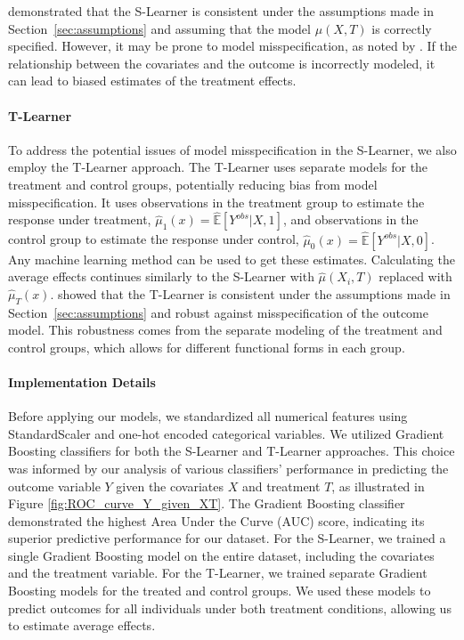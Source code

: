 \documentclass{article}
\begin{document}
\citet{hahn1998role} demonstrated that the S-Learner is consistent under the assumptions made in Section~\ref{sec:assumptions} and assuming that the model $\mu(X, T)$ is correctly specified. However, it may be prone to model misspecification, as noted by \citet{rubin1979using}. If the relationship between the covariates and the outcome is incorrectly modeled, it can lead to biased estimates of the treatment effects.

\paragraph{T-Learner} To address the potential issues of model misspecification in the S-Learner, we also employ the T-Learner approach. The T-Learner uses separate models for the treatment and control groups, potentially reducing bias from model misspecification. It uses observations in the treatment group to estimate the response under treatment, $\hat\mu_1(x) = \hat{\mathbb{E}}[Y^{obs} | X, 1]$, and observations in the control group to estimate the response under control, $\hat\mu_0(x) = \hat{\mathbb{E}}[Y^{obs} | X, 0]$. Any machine learning method can be used to get these estimates. Calculating the average effects continues similarly to the S-Learner with $\hat \mu (X_i, T)$ replaced with $\hat \mu_T(x)$.
\citet{greenland1986identifiability} showed that the T-Learner is consistent under the assumptions made in Section~\ref{sec:assumptions} and robust against misspecification of the outcome model. This robustness comes from the separate modeling of the treatment and control groups, which allows for different functional forms in each group.

\paragraph{Implementation Details} Before applying our models, we standardized all numerical features using StandardScaler and one-hot encoded categorical variables. We utilized Gradient Boosting classifiers for both the S-Learner and T-Learner approaches. This choice was informed by our analysis of various classifiers' performance in predicting the outcome variable $Y$ given the covariates $X$ and treatment $T$, as illustrated in Figure \ref{fig:ROC_curve_Y_given_XT}. The Gradient Boosting classifier demonstrated the highest Area Under the Curve (AUC) score, indicating its superior predictive performance for our dataset.
For the S-Learner, we trained a single Gradient Boosting model on the entire dataset, including the covariates and the treatment variable. For the T-Learner, we trained separate Gradient Boosting models for the treated and control groups. We used these models to predict outcomes for all individuals under both treatment conditions, allowing us to estimate average effects.
\end{document}
